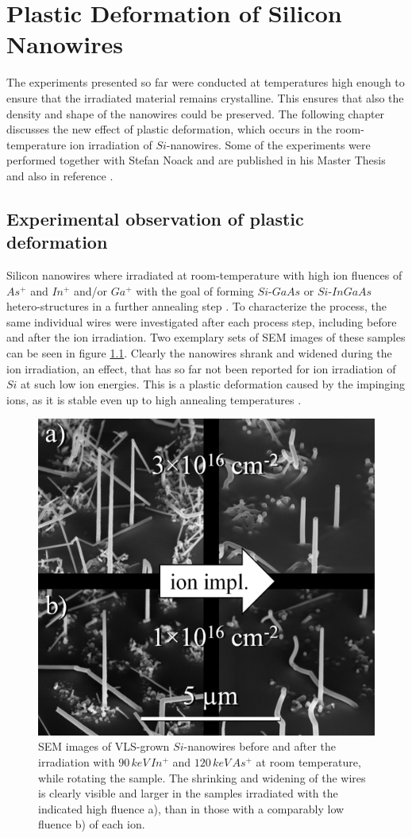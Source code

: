 \chapter{Plastic Deformation of Silicon Nanowires}

The experiments presented so far were conducted at temperatures high enough to ensure that the irradiated material remains crystalline. This ensures that also the density and shape of the nanowires could be preserved. The following chapter discusses the new effect of plastic deformation, which occurs in the room-temperature ion irradiation of $Si$-nanowires. Some of the experiments were performed together with Stefan Noack and are published in his Master Thesis \cite{noack_sputter_2014} and also in reference \cite{johannes_anomalous_2015}.

\section{Experimental observation of plastic deformation}
\label{sec:expdeformation}

Silicon nanowires where irradiated at room-temperature with high ion fluences of $As^+$ and $In^+$ and/or $Ga^+$ with the goal of forming $Si$-$GaAs$ or $Si$-$InGaAs$ hetero-structures in a further annealing step \cite{prucnal_iii-v_2014,glaser_personal_2015}. To characterize the process, the same individual wires were investigated after each process step, including before and after the ion irradiation. Two exemplary sets of SEM images of these samples can be seen in figure \ref{deformSEM}. Clearly the nanowires shrank and widened during the ion irradiation, an effect, that has so far not been reported for ion irradiation of $Si$ at such low ion energies. This is a plastic deformation caused by the impinging ions, as it is stable even up to high annealing temperatures \cite{prucnal_iii-v_2014,glaser_personal_2015}.

\begin{figure}
	\centering
		\includegraphics[width=.45\textwidth]{images/deformSEM.png}
	\caption{SEM images of VLS-grown $Si$-nanowires before and after the irradiation with $90\,keV\, In^+$ and $120\,keV\,As^+$ at room temperature, while rotating the sample. The shrinking and widening of the wires is clearly visible and larger in the samples irradiated with the indicated high fluence a), than in those with a comparably low fluence b) of each ion.} 
	\label{deformSEM}
\end{figure}

